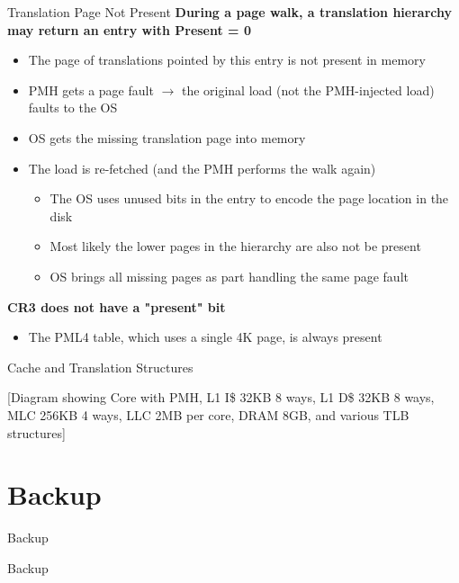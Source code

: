 \documentclass[aspectratio=169,12pt]{beamer}
\begin{document}
\begin{frame}{Translation Page Not Present}
\textbf{During a page walk, a translation hierarchy may return an entry with Present = 0}
\begin{itemize}
\item The page of translations pointed by this entry is not present in memory
\item PMH gets a page fault $\rightarrow$ the original load (not the PMH-injected load) faults to the OS
\item OS gets the missing translation page into memory
\item The load is re-fetched (and the PMH performs the walk again)
    \begin{itemize}
    \item The OS uses unused bits in the entry to encode the page location in the disk
    \item Most likely the lower pages in the hierarchy are also not be present
    \item OS brings all missing pages as part handling the same page fault
    \end{itemize}
\end{itemize}

\textbf{CR3 does not have a "present" bit}
\begin{itemize}
\item The PML4 table, which uses a single 4K page, is always present
\end{itemize}
\end{frame}

\begin{frame}{Cache and Translation Structures}
\begin{center}
[Diagram showing Core with PMH, L1 I\$ 32KB 8 ways, L1 D\$ 32KB 8 ways, MLC 256KB 4 ways, LLC 2MB per core, DRAM 8GB, and various TLB structures]
\end{center}
\end{frame}

\section{Backup}

\begin{frame}{Backup}
\begin{center}
\Huge Backup
\end{center}
\end{frame}
\end{document}
